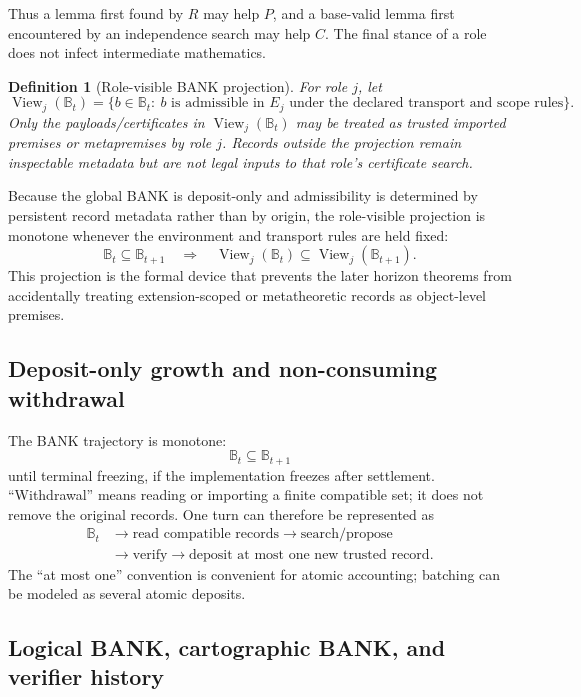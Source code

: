 \documentclass[11pt]{article}
\newtheorem{definition}{Definition}[section]
\newcommand{\BANK}{\mathbb{B}}
\newcommand{\View}{\operatorname{View}}
\begin{document}
Thus a lemma first found by $R$ may help $P$, and a base-valid lemma first encountered by an independence search may help $C$. The final stance of a role does not infect intermediate mathematics.

\begin{definition}[Role-visible BANK projection]
For role $j$, let
\[
\View_j(\BANK_t)
=
\{b\in\BANK_t:\ b\text{ is admissible in }E_j\text{ under the declared transport and scope rules}\}.
\]
Only the payloads/certificates in $\View_j(\BANK_t)$ may be treated as trusted imported premises or metapremises by role $j$. Records outside the projection remain inspectable metadata but are not legal inputs to that role's certificate search.
\end{definition}

Because the global BANK is deposit-only and admissibility is determined by persistent record metadata rather than by origin, the role-visible projection is monotone whenever the environment and transport rules are held fixed:
\[
\BANK_t\subseteq\BANK_{t+1}
\quad\Longrightarrow\quad
\View_j(\BANK_t)\subseteq\View_j(\BANK_{t+1}).
\]
This projection is the formal device that prevents the later horizon theorems from accidentally treating extension-scoped or metatheoretic records as object-level premises.

\subsection{Deposit-only growth and non-consuming withdrawal}

The BANK trajectory is monotone:
\[
\BANK_t\subseteq\BANK_{t+1}
\]
until terminal freezing, if the implementation freezes after settlement. ``Withdrawal'' means reading or importing a finite compatible set; it does not remove the original records. One turn can therefore be represented as
\[
\begin{aligned}
\BANK_t
&\longrightarrow \text{read compatible records}
\longrightarrow \text{search/propose}\\
&\longrightarrow \text{verify}
\longrightarrow \text{deposit at most one new trusted record}.
\end{aligned}
\]
The ``at most one'' convention is convenient for atomic accounting; batching can be modeled as several atomic deposits.

\subsection{Logical BANK, cartographic BANK, and verifier history}
\end{document}
